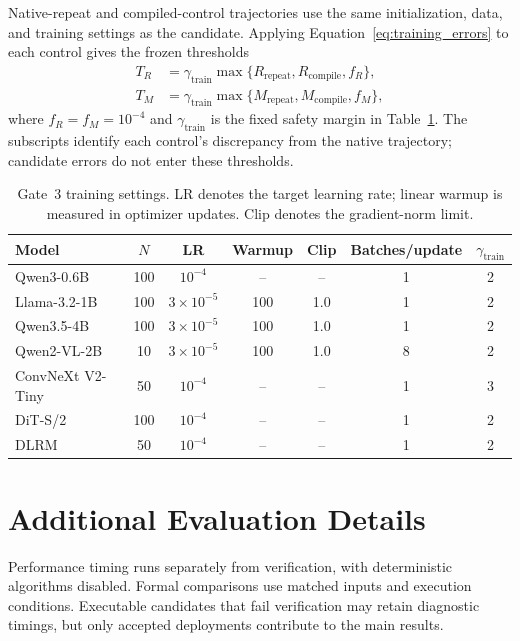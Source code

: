 Native-repeat and compiled-control trajectories use the same initialization, data, and training settings as the candidate. Applying Equation~\ref{eq:training_errors} to each control gives the frozen thresholds
\begin{equation}
\begin{aligned}
T_R&=\gamma_{\mathrm{train}}\max\{R_{\mathrm{repeat}},R_{\mathrm{compile}},f_R\},\\
T_M&=\gamma_{\mathrm{train}}\max\{M_{\mathrm{repeat}},M_{\mathrm{compile}},f_M\},
\end{aligned}
\label{eq:training_calibration}
\end{equation}
where $f_R=f_M=10^{-4}$ and $\gamma_{\mathrm{train}}$ is the fixed safety margin in Table~\ref{tab:gate3_settings}. The subscripts identify each control's discrepancy from the native trajectory; candidate errors do not enter these thresholds.

\begin{table}[t]
\centering
\caption{Gate~3 training settings. LR denotes the target learning rate; linear warmup is measured in optimizer updates. Clip denotes the gradient-norm limit.}
\label{tab:gate3_settings}
\begin{tabular}{lcccccc}
\toprule
Model & $N$ & LR & Warmup & Clip & Batches/update & $\gamma_{\mathrm{train}}$ \\
\midrule
Qwen3-0.6B       & 100 & $10^{-4}$        & --  & --  & 1 & 2 \\
Llama-3.2-1B     & 100 & $3\times10^{-5}$ & 100 & 1.0 & 1 & 2 \\
Qwen3.5-4B       & 100 & $3\times10^{-5}$ & 100 & 1.0 & 1 & 2 \\
Qwen2-VL-2B      & 10  & $3\times10^{-5}$ & 100 & 1.0 & 8 & 2 \\
ConvNeXt V2-Tiny & 50  & $10^{-4}$        & --  & --  & 1 & 3 \\
DiT-S/2          & 100 & $10^{-4}$        & --  & --  & 1 & 2 \\
DLRM             & 50  & $10^{-4}$        & --  & --  & 1 & 2 \\
\bottomrule
\end{tabular}
\end{table}


\section{Additional Evaluation Details}
\label{app:evaluation_details}

Performance timing runs separately from verification, with deterministic algorithms disabled. Formal comparisons use matched inputs and execution conditions. Executable candidates that fail verification may retain diagnostic timings, but only accepted deployments contribute to the main results.


